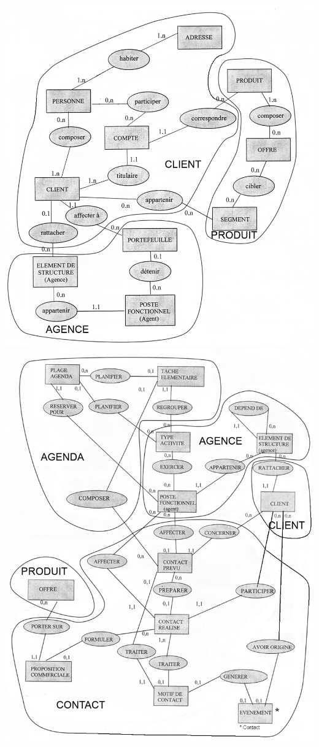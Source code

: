 \begin {center}
\includegraphics[width=\textwidth]{Decoupage MCD 1.png}
\includegraphics[width=\textwidth]{Decoupage MCD 2.png}
\end {center}

